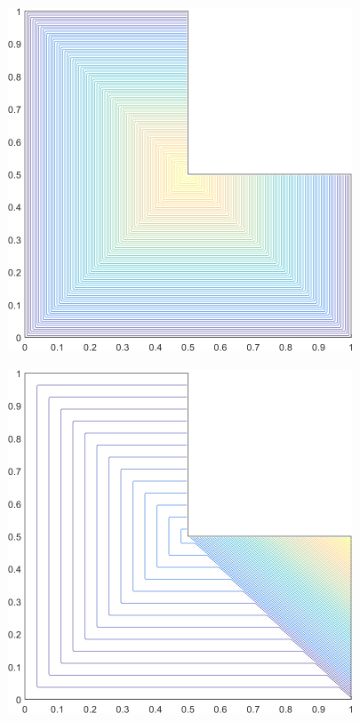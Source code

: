 \begin{figure}
\begin{subfigure}[b]{0.39\textwidth}
		\caption{}
	\end{subfigure}
	\vfill
	\begin{subfigure}[b]{0.39\textwidth}
		\centering
		\includegraphics[width=\textwidth]{figures/sec_BF/L-domain_PWLD1_contour_b4.png}
		\caption{}
	\end{subfigure}
	\hspace{1.5cm}
	\begin{subfigure}[b]{0.39\textwidth}
		\centering
		\includegraphics[width=\textwidth]{figures/sec_BF/L-domain_PWLD1_contour_b3.png}

\end{subfigure}
\end{figure}
